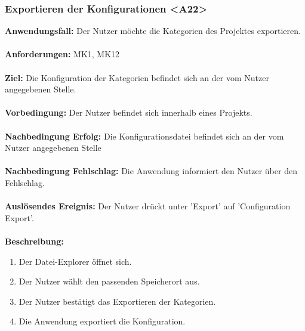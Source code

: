 \documentclass[parskip=full]{scrartcl} %
\begin{document}
\subsubsection*{Exportieren der Konfigurationen <A22>}
\textbf{Anwendungsfall:} Der Nutzer möchte die Kategorien des Projektes exportieren.\\\\
\textbf{Anforderungen:} MK1, MK12\\\\
\textbf{Ziel:} Die Konfiguration der Kategorien befindet sich an der vom Nutzer angegebenen Stelle.\\\\
\textbf{Vorbedingung:} Der Nutzer befindet sich innerhalb eines Projekts.\\\\
\textbf{Nachbedingung Erfolg:} Die Konfigurationsdatei befindet sich an der vom Nutzer angegebenen Stelle\\\\
\textbf{Nachbedingung Fehlschlag:}  Die Anwendung informiert den Nutzer über den Fehlschlag.\\\\
\textbf{Auslösendes Ereignis:} Der Nutzer drückt unter 'Export' auf 'Configuration Export'. \\\\
\textbf{Beschreibung:}
\begin{enumerate}
    \item Der Datei-Explorer öffnet sich.
    \item Der Nutzer wählt den passenden Speicherort aus.
    \item Der Nutzer bestätigt das Exportieren der Kategorien.
    \item Die Anwendung exportiert die Konfiguration.
\end{enumerate}
\newpage
\end{document}
